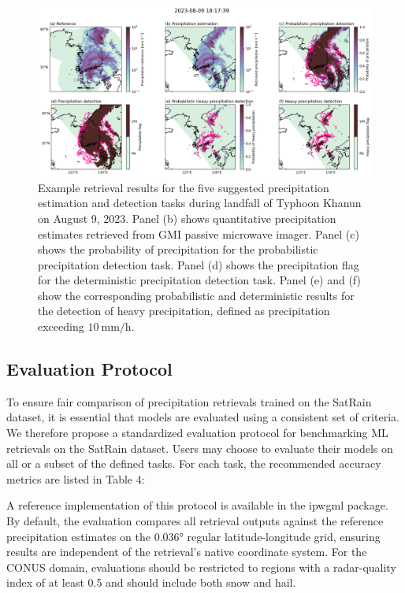 \documentclass[11pt]{article}
\begin{document}
\begin{figure}[htbp]
	\centering
	\includegraphics[width=1.0\textwidth]{figures/fig12}
	\caption{
 Example retrieval results for the five suggested precipitation estimation and
 detection tasks during landfall of Typhoon Khanun on August 9, 2023. Panel (b)
 shows quantitative precipitation estimates retrieved from GMI passive microwave
 imager. Panel (c) shows the probability of precipitation for the probabilistic
 precipitation detection task. Panel (d) shows the precipitation flag for the
 deterministic precipitation detection task. Panel (e) and (f) show the
 corresponding probabilistic and deterministic results for the detection of
 heavy precipitation, defined as precipitation exceeding $\SI{10}{\milli \meter \per \hour}$.
	}
	\label{fig:sensor_comparison}
\end{figure}


\subsection{Evaluation Protocol}

To ensure fair comparison of precipitation retrievals trained on the SatRain
dataset, it is essential that models are evaluated using a consistent set of
criteria. We therefore propose a standardized evaluation protocol for
benchmarking ML retrievals on the SatRain dataset. Users may
choose to evaluate their models on all or a subset of the defined tasks. For
each task, the recommended accuracy metrics are listed in Table 4:

A reference implementation of this protocol is available in the ipwgml package.
By default, the evaluation compares all retrieval outputs against the reference
precipitation estimates on the 0.036° regular latitude-longitude grid, ensuring
results are independent of the retrieval’s native coordinate system. For the
CONUS domain, evaluations should be restricted to regions with a radar-quality
index of at least 0.5 and should include both snow and hail.
\end{document}
